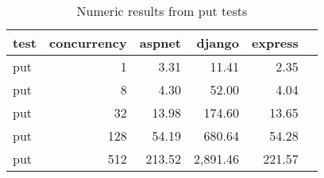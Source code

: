 \FloatBarrier
\begin{table}[!htp]\centering
    \caption{Numeric results from put tests}\label{tab:resultsPut}
    \scriptsize
    \begin{tabular}{lrrrrr}\toprule
        test & concurrency & aspnet & django   & express \\\midrule
put &1 &3.31 &11.41 &2.35 \\
put &8 &4.30 &52.00 &4.04 \\
put &32 &13.98 &174.60 &13.65 \\
put &128 &54.19 &680.64 &54.28 \\
put &512 &213.52 &2,891.46 &221.57 \\
        \bottomrule
    \end{tabular}
\end{table}
\FloatBarrier
